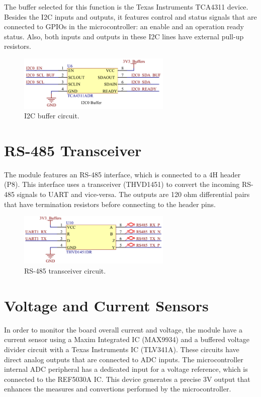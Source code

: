 The buffer selected for this function is the Texas Instruments TCA4311 device. Besides the I2C inputs and outputs, it features control and status signals that are connected to GPIOs in the microcontroller: an enable and an operation ready status. Also, both inputs and outputs in these I2C lines have external pull-up resistors.

\begin{figure}[!ht]
    \begin{center}
        \includegraphics[width=0.65\textwidth]{figures/i2c-buffer-circuit.png}
        \caption{I2C buffer circuit.}
        \label{fig:i2c-buffer-circuit}
    \end{center}
\end{figure}

\section{RS-485 Transceiver}

The module features an RS-485 interface, which is connected to a 4H header (P8). This interface uses a transceiver (THVD1451) to convert the incoming RS-485 signals to UART and vice-versa. The outputs are 120 ohm differential pairs that have termination resistors before connecting to the header pins.

\begin{figure}[!ht]
    \begin{center}
        \includegraphics[width=0.65\textwidth]{figures/rs485-transceiver-circuit.png}
        \caption{RS-485 transceiver circuit.}
        \label{fig:rs485-transceiver-circuit}
    \end{center}
\end{figure}

\section{Voltage and Current Sensors}

In order to monitor the board overall current and voltage, the module have a current sensor using a Maxim Integrated IC (MAX9934) and a buffered voltage divider circuit with a Texas Instruments IC (TLV341A). These circuits have direct analog outputs that are connected to ADC inputs. The microcontroller internal ADC peripheral has a dedicated input for a voltage reference, which is connected to the REF5030A IC. This device generates a precise 3V output that enhances the measures and convertions performed by the microcontroller. 